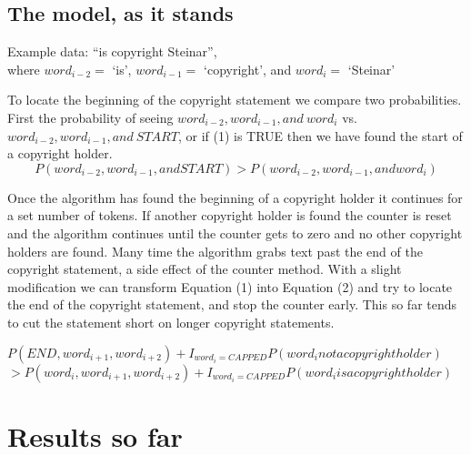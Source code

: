 \documentclass[10pt,a4paper]{article}
\begin{document}
\subsection{The model, as it stands}

Example data: ``is copyright Steinar'',\\
 where $word_{i-2} =$ `is', $word_{i-1} =$ `copyright', and $word_{i} =$ `Steinar'

To locate the beginning of the copyright statement we compare two probabilities. First the probability of seeing $word_{i-2}, word_{i-1}, and \ word_{i}$ vs. $word_{i-2}, word_{i-1}, and \ START$, or if (1) is TRUE then we have found the start of a copyright holder.
\begin{equation}
P(word_{i-2}, word_{i-1}, and START)
> P(word_{i-2}, word_{i-1}, and word_{i})
\end{equation}

Once the algorithm has found the beginning of a copyright holder it continues for a set number of tokens. If another copyright holder is found the counter is reset and the algorithm continues until the counter gets to zero and no other copyright holders are found. Many time the algorithm grabs text past the end of the copyright statement, a side effect of the counter method. With a slight modification we can transform Equation (1) into Equation (2) and try to locate the end of the copyright statement, and stop the counter early. This so far tends to cut the statement short on longer copyright statements.

$P(END, word_{i+1}, word_{i+2}) + I_{word_{i} = CAPPED} P(word_{i} not a copyright holder)$ \\
$> P(word_{i}, word_{i+1}, word_{i+2}) + I_{word_{i} = CAPPED} P(word_{i} is a copyright holder)$
\begin{equation}
\end{equation}

\section{Results so far}
\end{document}
